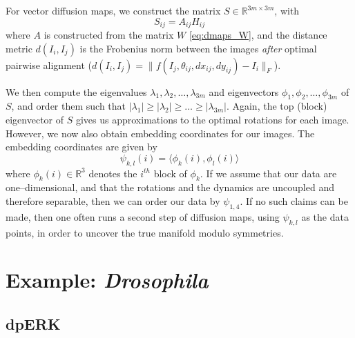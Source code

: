 \documentclass[twocolumn, 11pt]{article}
\begin{document}
For vector diffusion maps, we construct the matrix $S \in \mathbb{R}^{3m \times 3m}$, with
\begin{equation}
	S_{ij} = A_{ij} H_{ij}
\end{equation}
%
where $A$ is constructed from the matrix $W$ \eqref{eq:dmaps_W}, and the distance metric $d(I_i, I_j)$ is the Frobenius norm between the images {\em after} optimal pairwise alignment ($d(I_i, I_j) = \| f(I_j, \theta_{ij}, dx_{ij}, dy_{ij}) - I_i \|_F$).

We then compute the eigenvalues $\lambda_1, \lambda_2, \dots, \lambda_{3m}$ and eigenvectors $\phi_1, \phi_2, \dots, \phi_{3m}$ of $S$, and order them such that $|\lambda_1| \ge |\lambda_2| \ge \dots \ge |\lambda_{3m}|$.
%
Again, the top (block) eigenvector of $S$ gives us approximations to the optimal rotations for each image.
%
However, we now also obtain embedding coordinates for our images.
%
The embedding coordinates are given by 
\begin{equation}
\psi_{k,l} (i) = \langle \phi_k(i), \phi_l(i) \rangle
\end{equation}
where $\phi_k(i) \in \mathbb{R}^3$ denotes the $i^{th}$ block of $\phi_k$.
%
If we assume that our data are one--dimensional, and that the rotations and the dynamics are uncoupled and therefore separable, then we can order our data by $\psi_{1,4}$.
%
If no such claims can be made, then one often runs a second step of diffusion maps, using $\psi_{k,l}$ as the data points, in order to uncover the true manifold modulo symmetries. 


\section{Example: {\em Drosophila}}

\subsection{dpERK}
\end{document}

